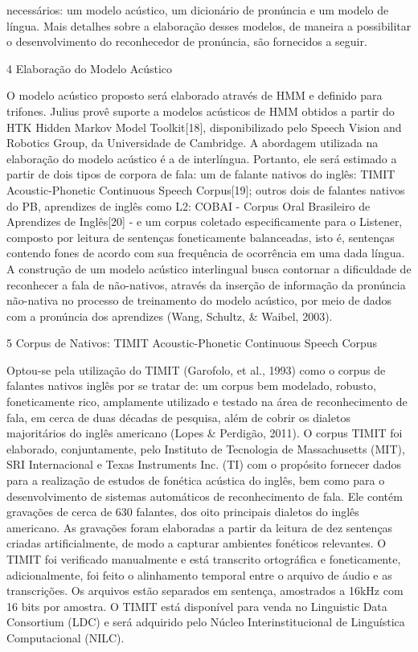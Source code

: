 necess\'arios: um modelo ac\'ustico, um dicion\'ario de pron\'uncia e um modelo
de l\'ingua. Mais detalhes sobre a elabora\c{c}\~ao desses modelos, de maneira a
possibilitar o desenvolvimento do reconhecedor de pron\'uncia, s\~ao
fornecidos a seguir.

4 Elabora\c{c}\~ao do Modelo Ac\'ustico

O modelo ac\'ustico proposto ser\'a elaborado atrav\'es de HMM e definido para
trifones. Julius prov\^e suporte a modelos ac\'usticos de HMM obtidos a
partir do HTK Hidden Markov Model Toolkit{[}18{]}, disponibilizado pelo
Speech Vision and Robotics Group, da Universidade de Cambridge. A
abordagem utilizada na elabora\c{c}\~ao do modelo ac\'ustico \'e a de interl\'ingua.
Portanto, ele ser\'a estimado a partir de dois tipos de corpora de fala:
um de falante nativos do ingl\^es: TIMIT Acoustic-Phonetic Continuous
Speech Corpus{[}19{]}; outros dois de falantes nativos do PB, aprendizes
de ingl\^es como L2: COBAI - Corpus Oral Brasileiro de Aprendizes de
Ingl\^es{[}20{]} - e um corpus coletado especificamente para o Listener,
composto por leitura de senten\c{c}as foneticamente balanceadas, isto \'e,
senten\c{c}as contendo fones de acordo com sua frequ\^encia de ocorr\^encia em
uma dada l\'ingua. A constru\c{c}\~ao de um modelo ac\'ustico interlingual busca
contornar a dificuldade de reconhecer a fala de n\~ao-nativos, atrav\'es da
inser\c{c}\~ao de informa\c{c}\~ao da pron\'uncia n\~ao-nativa no processo de
treinamento do modelo ac\'ustico, por meio de dados com a pron\'uncia dos
aprendizes (Wang, Schultz, \& Waibel, 2003).

5 Corpus de Nativos: TIMIT Acoustic-Phonetic Continuous Speech Corpus

Optou-se pela utiliza\c{c}\~ao do TIMIT (Garofolo, et al., 1993) como o corpus
de falantes nativos ingl\^es por se tratar de: um corpus bem modelado,
robusto, foneticamente rico, amplamente utilizado e testado na \'area de
reconhecimento de fala, em cerca de duas d\'ecadas de pesquisa, al\'em de
cobrir os dialetos majorit\'arios do ingl\^es americano (Lopes \& Perdig\~ao,
2011). O corpus TIMIT foi elaborado, conjuntamente, pelo Instituto de
Tecnologia de Massachusetts (MIT), SRI Internacional e Texas Instruments
Inc. (TI) com o prop\'osito fornecer dados para a realiza\c{c}\~ao de estudos de
fon\'etica ac\'ustica do ingl\^es, bem como para o desenvolvimento de sistemas
autom\'aticos de reconhecimento de fala. Ele cont\'em grava\c{c}\~oes de cerca de
630 falantes, dos oito principais dialetos do ingl\^es americano. As
grava\c{c}\~oes foram elaboradas a partir da leitura de dez senten\c{c}as criadas
artificialmente, de modo a capturar ambientes fon\'eticos relevantes. O
TIMIT foi verificado manualmente e est\'a transcrito ortogr\'afica e
foneticamente, adicionalmente, foi feito o alinhamento temporal entre o
arquivo de \'audio e as transcri\c{c}\~oes. Os arquivos est\~ao separados em
senten\c{c}a, amostrados a 16kHz com 16 bits por amostra. O TIMIT est\'a
dispon\'ivel para venda no Linguistic Data Consortium (LDC) e ser\'a
adquirido pelo N\'ucleo Interinstitucional de Lingu\'istica Computacional
(NILC).

